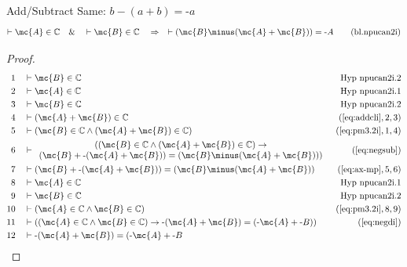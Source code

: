 \begin{lemma} {Add/Subtract Same: $b \minus ( a + b )
= \textrm{-} a$}
\begin{align}
\vdash \mc{A} \in \mathbb{C}\quad\&\quad \vdash \mc{B} \in
    \mathbb{C}\quad\Rightarrow\quad \vdash ( \mc{B} \minus ( \mc{A} + \mc{B} ) ) = \textrm{-}
    A\label{eq:bl.npucan2i}\tag{bl.npucan2i}
\end{align}
\end{lemma}


\begin{proof}
\begin{align}
  1 &&  & \vdash \mc{B} \in \mathbb{C}&\text{Hyp~npucan2i.2}\notag%
  \\ 2 &&  & \vdash \mc{A} \in \mathbb{C}&\text{Hyp~npucan2i.1}\notag%
  \\ 3 &&  & \vdash \mc{B} \in \mathbb{C}&\text{Hyp~npucan2i.2}\notag%
  \\ 4 &&  & \vdash ( \mc{A} + \mc{B} ) \in \mathbb{C}&(\mbox{\ref{eq:addcli}},2,3)\notag
  \\ 5 &&  & \vdash ( \mc{B} \in \mathbb{C} \wedge ( \mc{A} + \mc{B} ) \in \mathbb{C}
     )&(\mbox{\ref{eq:pm3.2i}},1,4)\notag
  \\ 6 &&  & \vdash
     \begin{array}{c}
     ( ( \mc{B} \in \mathbb{C} \wedge ( \mc{A} + \mc{B} ) \in \mathbb{C} )
     \rightarrow \\
     ( \mc{B} + \textrm{-} ( \mc{A} + \mc{B} ) ) = ( \mc{B} \minus
     ( \mc{A} + \mc{B} ) ) )
     \end{array}
     &(\mbox{\ref{eq:negsub}})\notag
  \\ 7 &&  & \vdash ( \mc{B} + \textrm{-} ( \mc{A} + \mc{B} ) ) = ( \mc{B} \minus ( \mc{A} + \mc{B} )
     )&(\mbox{\ref{eq:ax-mp}},5,6)\notag
  \\ 8 &&  & \vdash \mc{A} \in \mathbb{C}&\text{Hyp~npucan2i.1}\notag%
  \\ 9 &&  & \vdash \mc{B} \in \mathbb{C}&\text{Hyp~npucan2i.2}\notag%
  \\ 10 &&  & \vdash ( \mc{A} \in \mathbb{C} \wedge \mc{B} \in \mathbb{C}
     )&(\mbox{\ref{eq:pm3.2i}},8,9)\notag
  \\ 11 &&  & \vdash ( ( \mc{A} \in \mathbb{C} \wedge \mc{B} \in \mathbb{C} ) \rightarrow
     \textrm{-} ( \mc{A} + \mc{B} ) = ( \textrm{-} \mc{A} + \textrm{-} B
     ) )&(\mbox{\ref{eq:negdi}})\notag
  \\ 12 &&  & \vdash \textrm{-} ( \mc{A} + \mc{B} ) = ( \textrm{-} \mc{A} + \textrm{-} B

\end{align}
\end{proof}
